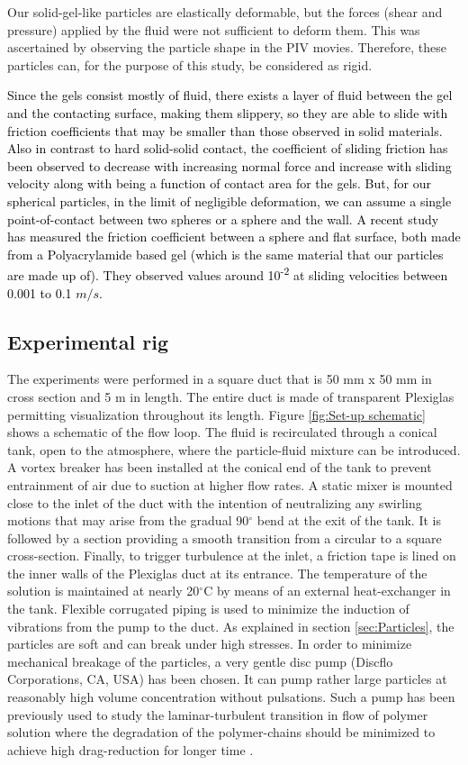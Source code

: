 \documentclass{jfm}
\def\sz#1{{\textcolor{black}{#1}}}
\begin{document}
Our solid-gel-like particles are elastically deformable, but the forces (shear and pressure) applied by the fluid were not sufficient to deform them. This was ascertained by observing the particle shape in the PIV movies. Therefore, these particles can, for the purpose of this study, be considered as rigid.

\sz{Since the gels consist mostly of fluid, there exists a layer of fluid between the gel and the contacting surface, making them slippery, so they are able to slide with friction coefficients 
that may be smaller than those observed in solid materials. Also in contrast to hard solid-solid contact, the coefficient of sliding friction has been observed to decrease with increasing normal force \citep{gong1997friction} and increase with sliding velocity along with being a function of contact area for the gels. But, for our spherical particles, in the limit of negligible deformation, we can assume a single point-of-contact between two spheres or a sphere and the wall. 
A recent study \citep{Emorybachelorthesis2017} has measured the friction coefficient between a sphere and flat surface, both made from a Polyacrylamide based gel (which is the same material that our particles are made up of). They observed values around 10\textsuperscript{-2} at sliding velocities between 0.001 to 0.1 $m/s$.} 


\subsection{Experimental rig}\label{sec:Experimental rig}
The experiments were performed in a square duct that is 50 mm x 50 mm in cross section and 5 m in length. The entire duct is made of transparent Plexiglas permitting visualization throughout its length. Figure \ref{fig:Set-up schematic} shows a schematic of the flow loop. The fluid is recirculated through a conical tank, open to the atmosphere, where the particle-fluid mixture can be introduced. A vortex breaker has been installed at the conical end of the tank to prevent entrainment of air due to suction at higher flow rates. A static mixer is mounted close to the inlet of the duct with the intention of neutralizing any swirling motions that may arise from the gradual 90$^\circ$ bend at the exit of the tank. It is followed by a section providing a smooth transition from a circular to a square cross-section. Finally, to trigger turbulence at the inlet, a friction tape is lined on the inner walls of the Plexiglas duct at its entrance. The temperature of the solution is maintained at nearly 20$^\circ$C by means of an external heat-exchanger in the tank. Flexible corrugated piping is used to minimize the induction of vibrations from the pump to the duct. As explained in section \ref{sec:Particles}, the particles are soft and can break under high stresses. In order to minimize mechanical breakage of the particles, a very gentle disc pump (Discflo Corporations, CA, USA) has been chosen. It can pump rather large particles at reasonably high volume concentration without pulsations. Such a pump has been previously used to study the laminar-turbulent transition in flow of polymer solution where the degradation of the polymer-chains should be minimized to achieve high drag-reduction for longer time \citep{draad1998laminar}. 
\end{document}

